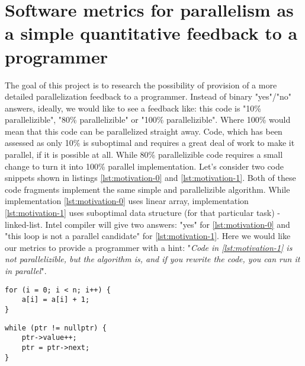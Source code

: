 \section{Software metrics for parallelism as a simple quantitative feedback to a programmer}
\null\qquad The goal of this project is to research the possibility of provision of a more detailed parallelization feedback to a programmer. Instead of binary "yes"/"no" answers, ideally, we would like to see a feedback like: this code is "10\% parallelizible", "80\% parallelizible" or "100\% parallelizible". Where 100\% would mean that this code can be parallelized straight away. Code, which has been assessed as only 10\% is  suboptimal and requires a great deal of work to make it parallel, if it is possible at all. While 80\% parallelizible code requires a small change to turn it into 100\% parallel implementation.\newline
\null\qquad Let's consider two code snippets shown in listings \ref{lst:motivation-0} and \ref{lst:motivation-1}. Both of these code fragments implement the same simple and parallelizible algorithm. While implementation \ref{lst:motivation-0} uses linear array, implementation \ref{lst:motivation-1} uses suboptimal data structure (for that particular task) - linked-list. Intel compiler will give two answers: "yes" for \ref{lst:motivation-0} and "this loop is not a parallel candidate" for \ref{lst:motivation-1}. Here we would like our metrics to provide a programmer with a hint: "\textit{Code in \ref{lst:motivation-1} is not parallelizible, but the algorithm is, and if you rewrite the code, you can run it in parallel}".   

\begin{lstlisting}[float,floatplacement=H,caption={Parallelizible algorithm is implemented with a parallelizible code - parallelizibility metric would report 100\% parallelizible.}, captionpos=b, label=lst:motivation-0]
for (i = 0; i < n; i++) {
	a[i] = a[i] + 1;
}
\end{lstlisting}

\begin{lstlisting}[float,floatplacement=H,caption={Parallelizible algorithm ends up hidden behind non-parallelizible construct (pointer chasing code) - metric would give, say, $\approx$ 20\% parallelizible - there is a great deal of work to do, before it can be turned into a parallel code, but it is possible.}, captionpos=b, label=lst:motivation-1]
while (ptr != nullptr) {
	ptr->value++;
	ptr = ptr->next;
}
\end{lstlisting}      

